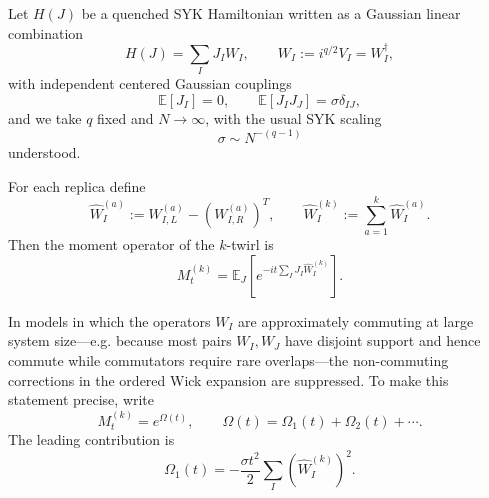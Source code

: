 \documentclass{article}
\theoremstyle{definition}
\begin{document}
Let $H(J)$ be a quenched SYK Hamiltonian written as a Gaussian linear
combination
\begin{equation}
    H(J)
    =
    \sum_I J_I W_I,
    \qquad
    W_I:=i^{q/2}V_I=W_I^\dagger,
    \label{eq:quenched_syk_H_general}
\end{equation}
with independent centered Gaussian couplings
\begin{equation}
    \mathbb E[J_I]=0,
    \qquad
    \mathbb E[J_IJ_J]
    =
    \sigma\delta_{IJ},
    \label{eq:quenched_syk_variance}
\end{equation}
and we take $q$ fixed and $N\rightarrow\infty$, with the usual SYK scaling
\begin{equation}
    \sigma\sim N^{-(q-1)}
\end{equation}
understood.

For each replica define
\begin{equation}
    \widehat W_I^{(a)}
    :=
    W_{I,L}^{(a)}
    -
    \left(W_{I,R}^{(a)}\right)^T,
    \qquad
    \widehat W_I^{(k)}
    :=
    \sum_{a=1}^k\widehat W_I^{(a)}.
\end{equation}
Then the moment operator of the $k$-twirl is
\begin{equation}
    M_t^{(k)}
    =
    \mathbb E_J
    \left[
       e^{-it\sum_IJ_I\widehat W_I^{(k)}}
    \right].
    \label{eq:quenched_Mk}
\end{equation}

In models in which the operators $W_I$ are approximately commuting at
large system size---e.g. because most pairs $W_I,W_J$ have disjoint support
and hence commute while commutators require rare overlaps---the
non-commuting corrections in the ordered Wick expansion are suppressed.
To make this statement precise, write
\begin{equation}
    M_t^{(k)}
    =
    e^{\Omega(t)},
    \qquad
    \Omega(t)
    =
    \Omega_1(t)+\Omega_2(t)+\cdots .
\end{equation}
The leading contribution is
\begin{equation}
    \Omega_1(t)
    =
    -\frac{\sigma t^2}{2}
    \sum_I
    \left(\widehat W_I^{(k)}\right)^2.
    \label{eq:quenched_Omega1}
\end{equation}
\end{document}
